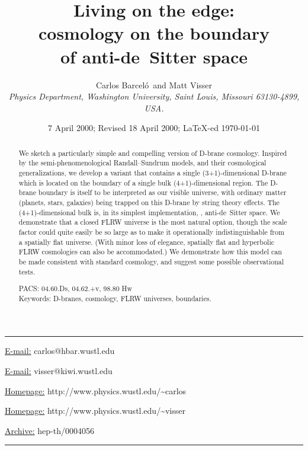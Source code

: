 \documentclass[a4paper,12pt]{article}
\begin{document}
   
\def\Barcelo{Barcel\'o}
\title{{\bf  Living on the edge: \\
\bf cosmology on the boundary \\
\bf of anti-de~Sitter space}}
\author{Carlos \Barcelo\ and Matt Visser\\[2mm]
{\small \it Physics Department, Washington University, 
Saint Louis, Missouri 63130-4899, USA.}}
\date{{\small 7 April 2000; Revised 18 April 2000; \LaTeX-ed \today}}
\maketitle
\begin{abstract}
We sketch a particularly simple and compelling version of D-brane
cosmology. Inspired by the semi-phenomenological Randall--Sundrum
models, and their cosmological generalizations, we develop a variant
that contains a single (3+1)-dimensional D-brane which is located on
the boundary of a single bulk (4+1)-dimensional region. The D-brane
boundary is itself to be interpreted as our visible universe, with
ordinary matter (planets, stars, galaxies) being trapped on this
D-brane by string theory effects. The (4+1)-dimensional bulk is, in
its simplest implementation, \coordHE{}, anti-de~Sitter space.  We
demonstrate that a \coordHE{} closed FLRW universe is the most natural
option, though the scale factor could quite easily be so large as to
make it operationally indistinguishable from a \coordHE{} spatially flat
universe. (With minor loss of elegance, spatially flat and hyperbolic
FLRW cosmologies can also be accommodated.) We demonstrate how this
model can be made consistent with standard cosmology, and suggest some
possible observational tests.

\vspace*{5mm}
\noindent
PACS: 04.60.Ds, 04.62.+v, 98.80 Hw
\\
Keywords: D-branes, cosmology, FLRW universes, boundaries.
\end{abstract}
\vfill
\hrule
\bigskip
\centerline{\underline{E-mail:} {\sf carlos@hbar.wustl.edu}}
\centerline{\underline{E-mail:} {\sf visser@kiwi.wustl.edu}}
\bigskip
\centerline{\underline{Homepage:} {\sf http://www.physics.wustl.edu/\~{}carlos}}
\centerline{\underline{Homepage:} {\sf http://www.physics.wustl.edu/\~{}visser}}
\bigskip
\centerline{\underline{Archive:}
{\sf hep-th/0004056}}
\bigskip
\hrule
\clearpage
\def\Box{\nabla^2}
\end{document}
